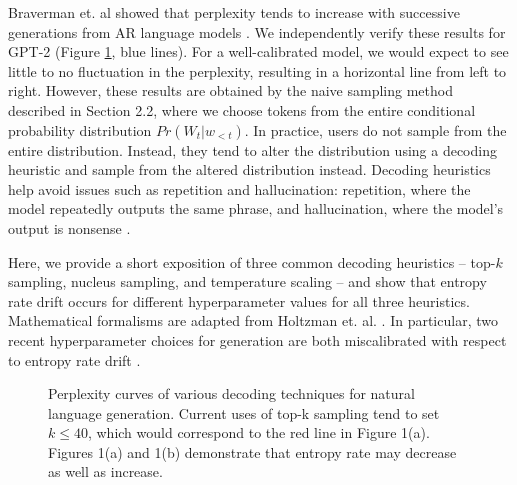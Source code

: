 \documentclass[pageno]{jpaper}
\begin{document}
Braverman et. al showed that perplexity tends to increase with successive generations from AR language models \cite{Braverman}. We independently verify these results for GPT-2 (Figure \ref{entropy-blowup}, blue lines). For a well-calibrated model, we would expect to see little to no fluctuation in the perplexity, resulting in a horizontal line from left to right. However, these results are obtained by the naive sampling method described in Section 2.2, where we choose tokens from the entire conditional probability distribution $Pr(W_t|w_{<t})$. In practice, users do not sample from the entire distribution. Instead, they tend to alter the distribution using a decoding heuristic and sample from the altered distribution instead. Decoding heuristics help avoid issues such as repetition and hallucination: repetition, where the model repeatedly outputs the same phrase, and hallucination, where the model's output is nonsense \cite{holtzman2019curious}.

Here, we provide a short exposition of three common decoding heuristics -- top-$k$ sampling, nucleus sampling, and temperature scaling -- and show that entropy rate drift occurs for different hyperparameter values for all three heuristics. Mathematical formalisms are adapted from Holtzman et. al. \cite{holtzman2019curious}. In particular, two recent hyperparameter choices for generation are both miscalibrated with respect to entropy rate drift \cite{radford2019language,holtzman2019curious}. 

\begin{figure}
    \centering
    \caption{Perplexity curves of various decoding techniques for natural language generation. Current uses of top-k sampling tend to set $k \leq 40$, which would correspond to the red line in Figure 1(a). Figures 1(a) and 1(b) demonstrate that entropy rate may decrease as well as increase.}
    \label{entropy-blowup}
\end{figure}
\end{document}
